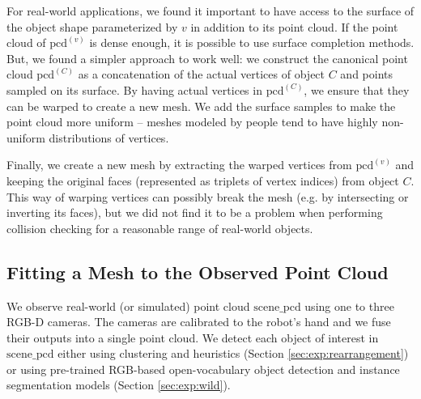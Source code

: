\documentclass{article}
\newcommand{\pcx}[1]{\mathrm{pcd}^{(#1)}}
\newcommand{\pcc}{\pcx{C}}
\begin{document}
For real-world applications, we found it important to have access to the surface of the object shape parameterized by $v$ in addition to its point cloud. If the point cloud of $\pcx{v}$ is dense enough, it is possible to use surface completion methods. But, we found a simpler approach to work well: we construct the canonical point cloud $\pcc$ as a concatenation of the actual vertices of object $C$ and points sampled on its surface. By having actual vertices in $\pcc$, we ensure that they can be warped to create a new mesh. We add the surface samples to make the point cloud more uniform -- meshes modeled by people tend to have highly non-uniform distributions of vertices.

Finally, we create a new mesh by extracting the warped vertices from $\pcx{v}$ and keeping the original faces (represented as triplets of vertex indices) from object $C$. This way of warping vertices can possibly break the mesh (e.g. by intersecting or inverting its faces), but we did not find it to be a problem when performing collision checking for a reasonable range of real-world objects.

\subsection{Fitting a Mesh to the Observed Point Cloud}
\label{sec:methods:scene}

We observe real-world (or simulated) point cloud $\mathrm{scene\_pcd}$ using one to three RGB-D cameras. The cameras are calibrated to the robot's hand and we fuse their outputs into a single point cloud. We detect each object of interest in $\mathrm{scene\_pcd}$ either using clustering and heuristics (Section \ref{sec:exp:rearrangement}) or using pre-trained RGB-based open-vocabulary object detection and instance segmentation models (Section \ref{sec:exp:wild}).
\end{document}
